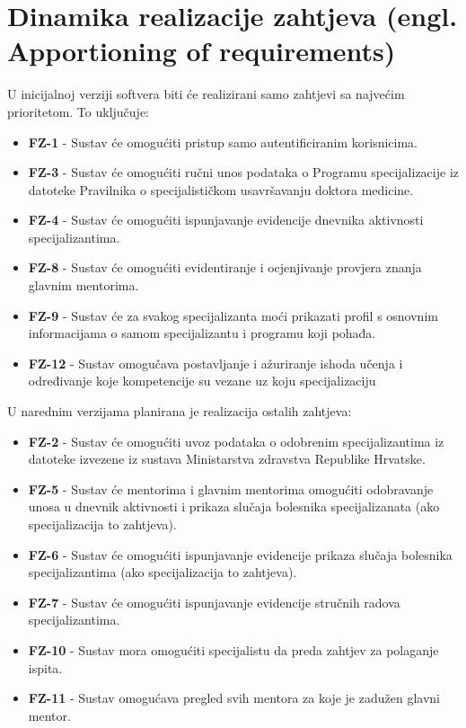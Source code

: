 \documentclass{scrreprt}
\begin{document}
\section{Dinamika realizacije zahtjeva (engl. Apportioning of requirements)}
U inicijalnoj verziji softvera biti će realizirani samo zahtjevi sa najvećim prioritetom. To uključuje:
\begin{itemize}
    \item[] \textbf{FZ-1} - Sustav će omogućiti pristup samo autentificiranim korisnicima.
    \item[] \textbf{FZ-3} - Sustav će omogućiti ručni unos podataka o Programu specijalizacije iz datoteke Pravilnika o specijalističkom usavršavanju doktora medicine.
    \item[] \textbf{FZ-4} - Sustav će omogućiti ispunjavanje evidencije dnevnika aktivnosti specijalizantima.
    \item[] \textbf{FZ-8} - Sustav će omogućiti evidentiranje i ocjenjivanje provjera znanja glavnim mentorima.
    \item[] \textbf{FZ-9} - Sustav će za svakog specijalizanta moći prikazati profil s osnovnim informacijama o samom specijalizantu i programu koji pohađa.
    \item[] \textbf{FZ-12} - Sustav omogučava postavljanje i ažuriranje ishoda učenja i određivanje koje kompetencije su vezane uz koju specijalizaciju\\
\end{itemize}

U narednim verzijama planirana je realizacija ostalih zahtjeva:
\begin{itemize}
    \item[] \textbf{FZ-2} - Sustav će omogućiti uvoz podataka o odobrenim specijalizantima iz datoteke izvezene iz sustava Ministarstva zdravstva Republike Hrvatske.
    \item[] \textbf{FZ-5} - Sustav će mentorima i glavnim mentorima omogućiti odobravanje unosa u dnevnik aktivnosti i prikaza slučaja bolesnika specijalizanata (ako specijalizacija to zahtjeva).
    \item[] \textbf{FZ-6} - Sustav će omogućiti ispunjavanje evidencije prikaza slučaja bolesnika specijalizantima (ako specijalizacija to zahtjeva).
    \item[] \textbf{FZ-7} - Sustav će omogućiti ispunjavanje evidencije stručnih radova specijalizantima.
    \item[] \textbf{FZ-10} - Sustav mora omogućiti specijalistu da preda zahtjev za polaganje ispita.
    \item[] \textbf{FZ-11} - Sustav omogućava pregled svih mentora za koje je zadužen glavni mentor.
\end{itemize}
\end{document}
